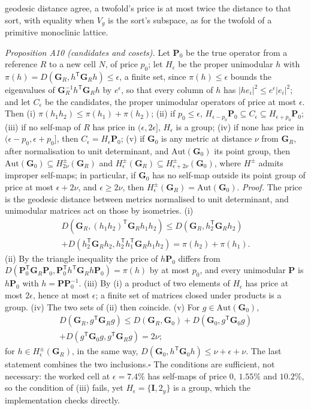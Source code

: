 \documentclass[preprint,pdf]{iucr}          %
\newcommand{\Gmet}{\mathbf{G}}
\newcommand{\Pop}{\mathbf{P}}
\newcommand{\dist}{D}
\begin{document}
geodesic distance agree, a twofold's price is at most twice the distance to that sort, with equality when $V_g$ is the sort's subspace, as for the twofold of a primitive monoclinic lattice.

\emph{Proposition A10 (candidates and cosets).} Let $\Pop_0$ be the true operator from a reference $R$ to a new cell $N$, of price $p_0$; let $H_\epsilon$ be the proper unimodular $h$ with $\pi(h)=\dist(\Gmet_R,h^{\mathsf T}\Gmet_Rh)\le\epsilon$, a finite set, since $\pi(h)\le\epsilon$ bounds the eigenvalues of $\Gmet_R^{-1}h^{\mathsf T}\Gmet_Rh$ by $e^{\epsilon}$, so that every column of $h$ has $|he_i|^2\le e^{\epsilon}|e_i|^2$; and let $C_\epsilon$ be the candidates, the proper unimodular operators of price at most $\epsilon$. Then (i) $\pi(h_1h_2)\le\pi(h_1)+\pi(h_2)$; (ii) if $p_0\le\epsilon$, $H_{\epsilon-p_0}\Pop_0\subseteq C_\epsilon\subseteq H_{\epsilon+p_0}\Pop_0$; (iii) if no self-map of $R$ has price in $(\epsilon,2\epsilon]$, $H_\epsilon$ is a group; (iv) if none has price in $(\epsilon-p_0,\epsilon+p_0]$, then $C_\epsilon=H_\epsilon\Pop_0$; (v) if $\Gmet_0$ is any metric at distance $\nu$ from $\Gmet_R$, after normalisation to unit determinant, and $\mathrm{Aut}(\Gmet_0)$ its point group, then $\mathrm{Aut}(\Gmet_0)\subseteq H^{\pm}_{2\nu}(\Gmet_R)$ and $H^{\pm}_{\epsilon}(\Gmet_R)\subseteq H^{\pm}_{\epsilon+2\nu}(\Gmet_0)$, where $H^{\pm}$ admits improper self-maps; in particular, if $\Gmet_0$ has no self-map outside its point group of price at most $\epsilon+2\nu$, and $\epsilon\ge2\nu$, then $H^{\pm}_\epsilon(\Gmet_R)=\mathrm{Aut}(\Gmet_0)$. \emph{Proof.} The price is the geodesic distance between metrics normalised to unit determinant, and unimodular matrices act on those by isometries. (i) \begin{multline*}\dist(\Gmet_R,(h_1h_2)^{\mathsf T}\Gmet_Rh_1h_2)\le\dist(\Gmet_R,h_2^{\mathsf T}\Gmet_Rh_2)\\+\dist(h_2^{\mathsf T}\Gmet_Rh_2,h_2^{\mathsf T}h_1^{\mathsf T}\Gmet_Rh_1h_2)=\pi(h_2)+\pi(h_1).\end{multline*} (ii) By the triangle inequality the price of $h\Pop_0$ differs from $\dist(\Pop_0^{\mathsf T}\Gmet_R\Pop_0,\Pop_0^{\mathsf T}h^{\mathsf T}\Gmet_Rh\Pop_0)=\pi(h)$ by at most $p_0$, and every unimodular $\Pop$ is $h\Pop_0$ with $h=\Pop\Pop_0^{-1}$. (iii) By (i) a product of two elements of $H_\epsilon$ has price at most $2\epsilon$, hence at most $\epsilon$; a finite set of matrices closed under products is a group. (iv) The two sets of (ii) then coincide. (v) For $g\in\mathrm{Aut}(\Gmet_0)$, \begin{multline*}\dist(\Gmet_R,g^{\mathsf T}\Gmet_Rg)\le\dist(\Gmet_R,\Gmet_0)+\dist(\Gmet_0,g^{\mathsf T}\Gmet_0g)\\+\dist(g^{\mathsf T}\Gmet_0g,g^{\mathsf T}\Gmet_Rg)=2\nu;\end{multline*} for $h\in H^{\pm}_\epsilon(\Gmet_R)$, in the same way, $\dist(\Gmet_0,h^{\mathsf T}\Gmet_0h)\le\nu+\epsilon+\nu$. The last statement combines the two inclusions.\hfill$\square$ The conditions are sufficient, not necessary: the worked cell at $\epsilon=7.4\%$ has self-maps of price $0$, $1.55\%$ and $10.2\%$, so the condition of (iii) fails, yet $H_\epsilon=\{\mathbf I,2_y\}$ is a group, which the implementation checks directly.
\end{document}
